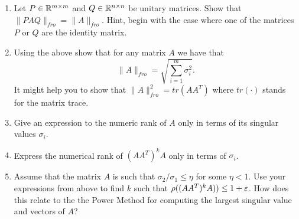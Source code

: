 \begin{enumerate}
\item Let $P \in {\mathbb{R}}^{m \times m}$ and $Q \in {\mathbb{R}}^{n \times n}$ be unitary matrices.
Show that $\|PAQ\|_{fro} = \|A\|_{fro}$.
Hint, begin with the case where one of the matrices $P$ or $Q$ are the identity matrix.
\item Using the above show that for any matrix $A$ we have that 
\[
\|A\|_{fro} = \sqrt{\sum_{i=1}^{m}\sigma_{i}^{2}}.
\]
It might help you to show that $\|A\|^{2}_{fro} = tr(AA^T)$ where $tr(\cdot)$ stands for the matrix trace.
\item Give an expression to the numeric rank of $A$ only in terms of its singular values $\sigma_i$. 
\item Express the numerical rank of $(AA^T)^{k}A$ only in terms of  $\sigma_i$.
\item Assume that the matrix $A$ is such that $\sigma_2/\sigma_1 \le \eta$ for some $\eta < 1$.
Use your expressions from above to find $k$ such that $\rho((AA^T)^{k}A)) \le  1+ \varepsilon$.
How does this relate to the the Power Method for computing the largest singular value and vectors of $A$?
\end{enumerate}
























